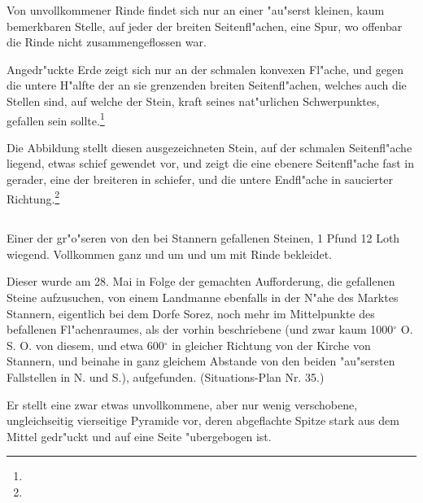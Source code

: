 \documentclass[a4paper, 11pt, oneside, german]{article}
\begin{document}
Von unvollkommener Rinde findet sich nur an einer "au"serst kleinen, kaum bemerkbaren Stelle, auf jeder der breiten Seitenfl"achen, eine Spur, wo offenbar die Rinde nicht zusammengeflossen war.

Angedr"uckte Erde zeigt sich nur an der schmalen konvexen Fl"ache, und gegen die untere H"alfte der an sie grenzenden breiten Seitenfl"achen, welches auch die Stellen sind, auf welche der Stein, kraft seines nat"urlichen Schwerpunktes, gefallen sein sollte.\footnote{}

Die Abbildung stellt diesen ausgezeichneten Stein, auf der schmalen Seitenfl"ache liegend, etwas schief gewendet vor, und zeigt die eine ebenere Seitenfl"ache fast in gerader, eine der breiteren in schiefer, und die untere Endfl"ache in saucierter Richtung.\footnote{}

\subsection{}
\paragraph{}
Einer der gr"o"seren von den bei Stannern gefallenen Steinen, 1 Pfund 12 Loth wiegend. Vollkommen ganz und um und um mit Rinde bekleidet.

Dieser wurde am 28. Mai in Folge der gemachten Aufforderung, die gefallenen Steine aufzusuchen, von einem Landmanne ebenfalls in der N"ahe des Marktes Stannern, eigentlich bei dem Dorfe Sorez, noch mehr im Mittelpunkte des befallenen Fl"achenraumes, als der vorhin beschriebene (und zwar kaum 1000$^{\circ}$ O. S. O. von diesem, und etwa 600$^{\circ}$ in gleicher Richtung von der Kirche von Stannern, und beinahe in ganz gleichem Abstande von den beiden "au"sersten Fallstellen in N. und S.), aufgefunden. (Situations-Plan Nr. 35.)

Er stellt eine zwar etwas unvollkommene, aber nur wenig verschobene, ungleichseitig vierseitige Pyramide vor, deren abgeflachte Spitze stark aus dem Mittel gedr"uckt und auf eine Seite "ubergebogen ist.
\end{document}
